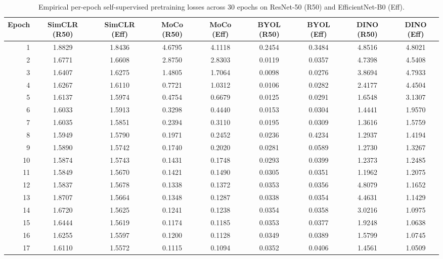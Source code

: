 \documentclass[11pt,a4paper]{article}
\begin{document}
\begin{table}[htbp]
\centering
\caption{Empirical per-epoch self-supervised pretraining losses across 30 epochs on ResNet-50 (R50) and EfficientNet-B0 (Eff).}
\label{tab:s1_loss}
\begin{adjustbox}{max width=\textwidth}
\renewcommand{\arraystretch}{0.91}
\footnotesize
\begin{tabular}{r c c c c c c c c}
\toprule
\textbf{Epoch} & \textbf{SimCLR (R50)} & \textbf{SimCLR (Eff)} & \textbf{MoCo (R50)} & \textbf{MoCo (Eff)} & \textbf{BYOL (R50)} & \textbf{BYOL (Eff)} & \textbf{DINO (R50)} & \textbf{DINO (Eff)} \\
\midrule
1 & 1.8829 & 1.8436 & 4.6795 & 4.1118 & 0.2454 & 0.3484 & 4.8516 & 4.8021 \\
2 & 1.6771 & 1.6608 & 2.8750 & 2.8303 & 0.0119 & 0.0357 & 4.7398 & 4.5408 \\
3 & 1.6407 & 1.6275 & 1.4805 & 1.7064 & 0.0098 & 0.0276 & 3.8694 & 4.7933 \\
4 & 1.6267 & 1.6110 & 0.7721 & 1.0312 & 0.0106 & 0.0282 & 2.4177 & 4.4504 \\
5 & 1.6137 & 1.5974 & 0.4754 & 0.6679 & 0.0125 & 0.0291 & 1.6548 & 3.1307 \\
6 & 1.6033 & 1.5913 & 0.3298 & 0.4440 & 0.0153 & 0.0304 & 1.4441 & 1.9570 \\
7 & 1.6035 & 1.5851 & 0.2394 & 0.3110 & 0.0195 & 0.0309 & 1.3616 & 1.5759 \\
8 & 1.5949 & 1.5790 & 0.1971 & 0.2452 & 0.0236 & 0.4234 & 1.2937 & 1.4194 \\
9 & 1.5890 & 1.5742 & 0.1740 & 0.2020 & 0.0281 & 0.0589 & 1.2730 & 1.3267 \\
10 & 1.5874 & 1.5743 & 0.1431 & 0.1748 & 0.0293 & 0.0399 & 1.2373 & 1.2485 \\
11 & 1.5849 & 1.5670 & 0.1421 & 0.1490 & 0.0305 & 0.0351 & 1.1962 & 1.2075 \\
12 & 1.5837 & 1.5678 & 0.1338 & 0.1372 & 0.0353 & 0.0356 & 4.8079 & 1.1652 \\
13 & 1.8707 & 1.5664 & 0.1348 & 0.1287 & 0.0338 & 0.0354 & 4.4631 & 1.1429 \\
14 & 1.6720 & 1.5625 & 0.1241 & 0.1238 & 0.0354 & 0.0358 & 3.0216 & 1.0975 \\
15 & 1.6444 & 1.5619 & 0.1174 & 0.1185 & 0.0353 & 0.0377 & 1.9248 & 1.0638 \\
16 & 1.6255 & 1.5597 & 0.1200 & 0.1128 & 0.0349 & 0.0389 & 1.5799 & 1.0745 \\
17 & 1.6110 & 1.5572 & 0.1115 & 0.1094 & 0.0352 & 0.0406 & 1.4561 & 1.0509 \\

\end{tabular}
\end{adjustbox}
\end{table}
\end{document}
